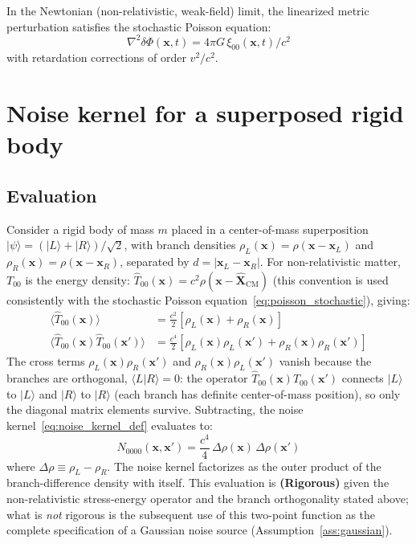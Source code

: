 \documentclass[12pt,a4paper]{article}
\theoremstyle{remark}
\begin{document}
In the Newtonian (non-relativistic, weak-field)
limit, the linearized metric perturbation satisfies the stochastic Poisson equation:
\begin{equation}
\nabla^2 \delta\Phi(\mathbf{x},t) = 4\pi G\,\xi_{00}(\mathbf{x},t)/c^2
\label{eq:poisson_stochastic}
\end{equation}
with retardation corrections of order $v^2/c^2$.

\section{Noise kernel for a superposed rigid body}
\label{sec:noise_kernel}

\subsection{Evaluation}

Consider a rigid body of mass $m$ placed in a center-of-mass superposition
$|\psi\rangle = (|L\rangle + |R\rangle)/\sqrt{2}$, with branch densities
$\rho_L(\mathbf{x}) = \rho(\mathbf{x}-\mathbf{x}_L)$ and
$\rho_R(\mathbf{x}) = \rho(\mathbf{x}-\mathbf{x}_R)$, separated by
$d = |\mathbf{x}_L - \mathbf{x}_R|$. For non-relativistic matter, $T_{00}$ is the energy
density: $\hat{T}_{00}(\mathbf{x}) = c^2\rho(\mathbf{x}-\hat{\mathbf{X}}_{\text{CM}})$
(this convention is used consistently with the stochastic Poisson
equation~\eqref{eq:poisson_stochastic}), giving:
\begin{align}
\langle\hat{T}_{00}(\mathbf{x})\rangle &=
\tfrac{c^2}{2}\!\left[\rho_L(\mathbf{x}) + \rho_R(\mathbf{x})\right] \\
\langle\hat{T}_{00}(\mathbf{x})\hat{T}_{00}(\mathbf{x}')\rangle &=
\tfrac{c^4}{2}\!\left[\rho_L(\mathbf{x})\rho_L(\mathbf{x}')
+ \rho_R(\mathbf{x})\rho_R(\mathbf{x}')\right]
\end{align}
The cross terms $\rho_L(\mathbf{x})\rho_R(\mathbf{x}')$ and
$\rho_R(\mathbf{x})\rho_L(\mathbf{x}')$ vanish because the branches are orthogonal,
$\langle L|R\rangle = 0$: the operator
$\hat{T}_{00}(\mathbf{x})\hat{T}_{00}(\mathbf{x}')$ connects $|L\rangle$ to $|L\rangle$
and $|R\rangle$ to $|R\rangle$ (each branch has definite center-of-mass position), so only
the diagonal matrix elements survive.
Subtracting, the noise kernel~\eqref{eq:noise_kernel_def} evaluates to:
\begin{equation}
N_{0000}(\mathbf{x},\mathbf{x}') = \frac{c^4}{4}\,\Delta\rho(\mathbf{x})\,\Delta\rho(\mathbf{x}')
\label{eq:N0000}
\end{equation}
where $\Delta\rho \equiv \rho_L - \rho_R$. The noise kernel factorizes as the outer
product of the branch-difference density with itself. This evaluation is
\textbf{(Rigorous)} given the non-relativistic stress-energy operator and the branch
orthogonality stated above; what is \emph{not} rigorous is the subsequent use of this
two-point function as the complete specification of a Gaussian noise source
(Assumption~\ref{ass:gaussian}).
\end{document}
